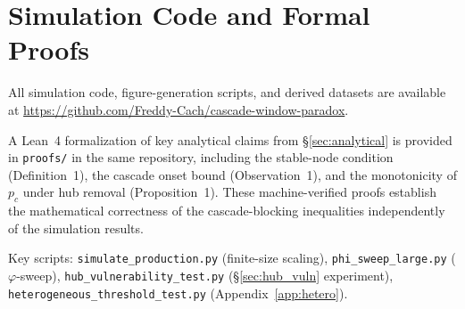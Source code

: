 \documentclass[aps,pre,twocolumn,superscriptaddress,showpacs]{revtex4-2}
\newcommand{\pc}{p_c}
\begin{document}
\section{Simulation Code and Formal Proofs}
\label{app:code}

All simulation code, figure-generation scripts, and derived datasets are available at \url{https://github.com/Freddy-Cach/cascade-window-paradox}.

A Lean~4 formalization of key analytical claims from \S\ref{sec:analytical} is provided in \texttt{proofs/} in the same repository, including the stable-node condition (Definition~1), the cascade onset bound (Observation~1), and the monotonicity of $\pc$ under hub removal (Proposition~1). These machine-verified proofs establish the mathematical correctness of the cascade-blocking inequalities independently of the simulation results.

Key scripts: \texttt{simulate\_production.py} (finite-size scaling), \texttt{phi\_sweep\_large.py} ($\varphi$-sweep), \texttt{hub\_vulnerability\_test.py} (\S\ref{sec:hub_vuln} experiment), \texttt{heterogeneous\_threshold\_test.py} (Appendix~\ref{app:hetero}).
\end{document}
